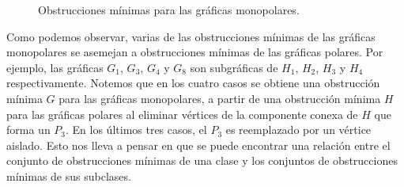 \begin{figure}[ht!]
\begin{center}
\begin{subfigure}{\textwidth}
\begin{center}
\end{center}
\end{subfigure}

\end{center}
\caption{Obstrucciones mínimas para las gráficas monopolares.}
\label{obsts_cografics_monopolares}
\end{figure}


Como podemos observar, varias de las obstrucciones mínimas
de las gráficas monopolares se asemejan a obstrucciones
mínimas de las gráficas polares. Por ejemplo, las gráficas
$G_1$, $G_3$, $G_4$ y $G_8$ son subgráficas de $H_1$, $H_2$,
$H_3$ y $H_4$ respectivamente. Notemos que en los cuatro
casos se obtiene una obstrucción mínima $G$ para las gráficas
monopolares, a partir de una obstrucción mínima $H$ para las
gráficas polares al eliminar vértices de la componente conexa
de $H$ que forma un $P_3$. En los últimos tres casos, el
$P_3$ es reemplazado por un vértice aislado. Esto nos lleva
a pensar en que se puede encontrar una relación entre el
conjunto de obstrucciones mínimas de una clase y los conjuntos
de obstrucciones mínimas de sus subclases.
